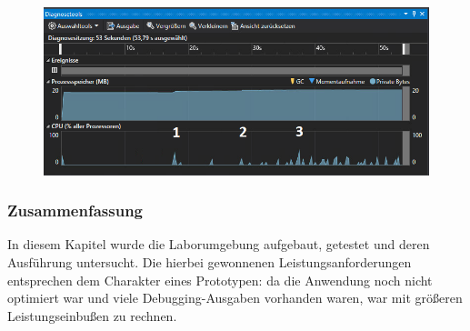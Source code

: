     \begin{figure}[!h]%
        \centering
        \includegraphics[width=14cm]{tex/bilder/6_validierung/Performance.png}
        \label{fig:performance}
    \end{figure}
    
\subsubsection{Zusammenfassung}
    In diesem Kapitel wurde die Laborumgebung aufgebaut, getestet und deren Ausführung untersucht. Die hierbei gewonnenen Leistungsanforderungen entsprechen dem Charakter eines Prototypen: da die Anwendung noch nicht optimiert war und viele Debugging-Ausgaben vorhanden waren, war mit größeren Leistungseinbußen zu rechnen.